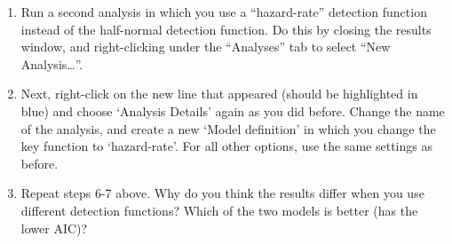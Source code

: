 \documentclass[12pt]{article}
\begin{document}
\begin{enumerate}
  \item Run a second analysis in which you use a ``hazard-rate''
    detection function instead of the half-normal detection
    function. Do this by closing the results window, and
    right-clicking under the ``Analyses'' tab to select ``New Analysis\dots''.  
  \item Next, right-click on the new line that appeared (should be
    highlighted in blue) and choose `Analysis Details' again as you
    did before. Change the name of the analysis, and create a new
    `Model definition' in which you change the key function to
    `hazard-rate'. For all other options, use the same settings as
    before.   
  \item Repeat steps 6-7 above. Why do you think the results differ
    when you use different detection functions? Which of the two
    models is better (has the lower AIC)?  
\end{enumerate}
\end{document}

